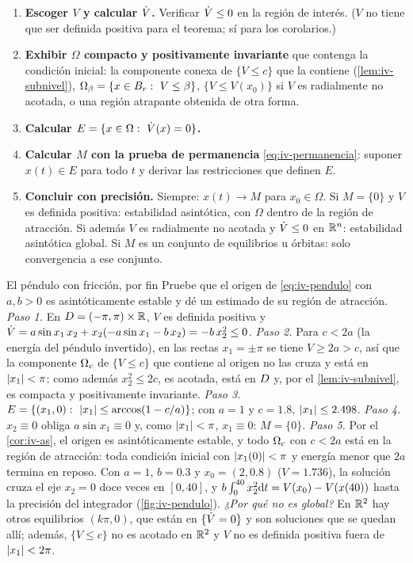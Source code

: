 \begin{receta}
\begin{enumerate}
  \item \textbf{Escoger $V$ y calcular $\dot V$.} Verificar $\dot V\le0$ en la región de interés. ($V$ no tiene que ser definida positiva para el teorema; sí para los corolarios.)
  \item \textbf{Exhibir $\Omega$ compacto y positivamente invariante} que contenga la condición inicial: la componente conexa de $\{V\le c\}$ que la contiene (\cref{lem:iv-subnivel}), $\Omega_\beta=\{x\in B_{r}:\ V\le\beta\}$, $\{V\le V(x_0)\}$ si $V$ es radialmente no acotada, o una región atrapante obtenida de otra forma.
  \item \textbf{Calcular $E=\{x\in\Omega:\ \Vdot(x)=0\}$.}
  \item \textbf{Calcular $M$ con la prueba de permanencia} \eqref{eq:iv-permanencia}: suponer $x(t)\in E$ para todo $t$ y derivar las restricciones que definen $E$.
  \item \textbf{Concluir con precisión.} Siempre: $x(t)\to M$ para $x_0\in\Omega$. Si $M=\{0\}$ y $V$ es definida positiva: estabilidad asintótica, con $\Omega$ dentro de la región de atracción. Si además $V$ es radialmente no acotada y $\dot V\le0$ en $\mathbb{R}^n$: estabilidad asintótica global. Si $M$ es un conjunto de equilibrios u órbitas: solo convergencia a ese conjunto.
\end{enumerate}
\end{receta}

\begin{ejemplo}[label=ej:iv-pendulo]{El péndulo con fricción, por fin}
Pruebe que el origen de \eqref{eq:iv-pendulo} con $a,b>0$ es asintóticamente estable y dé un estimado de su región de atracción.
\solucion \emph{Paso 1.} En $D=(-\pi,\pi)\times\mathbb{R}$, $V$ es definida positiva y $\dot V=a\sin x_1\,x_2+x_2(-a\sin x_1-b\,x_2)=-b\,x_2^2\le0$.
\emph{Paso 2.} Para $c<2a$ (la energía del péndulo invertido), en las rectas $x_1=\pm\pi$ se tiene $V\ge2a>c$, así que la componente $\Omega_{c}$ de $\{V\le c\}$ que contiene al origen no las cruza y está en $\left\lvert x_1\right\rvert<\pi$; como además $x_2^2\le2c$, es acotada, está en $D$ y, por el \cref{lem:iv-subnivel}, es compacta y positivamente invariante.
\emph{Paso 3.} $E=\{(x_1,0):\ \left\lvert x_1\right\rvert\le\arccos(1-c/a)\}$; con $a=1$ y $c=1.8$, $\left\lvert x_1\right\rvert\le2.498$.
\emph{Paso 4.} $x_2\equiv0$ obliga $a\sin x_1\equiv0$ y, como $\left\lvert x_1\right\rvert<\pi$, $x_1\equiv0$: $M=\{0\}$.
\emph{Paso 5.} Por el \cref{cor:iv-as}, el origen es asintóticamente estable, y todo $\Omega_{c}$ con $c<2a$ está en la región de atracción: toda condición inicial con $\left\lvert x_1(0)\right\rvert<\pi$ y energía menor que $2a$ termina en reposo. Con $a=1$, $b=0.3$ y $x_0=(2,0.8)$ ($V=1.736$), la solución cruza el eje $x_2=0$ doce veces en $[0,40]$, y $b\int_0^{40}x_2^2\mathrm{d} t=V(x_0)-V(x(40))$ hasta la precisión del integrador (\cref{fig:iv-pendulo}).
\emph{¿Por qué no es global?} En $\mathbb{R}^2$ hay otros equilibrios $(k\pi,0)$, que están en $\{\dot V=0\}$ y son soluciones que se quedan allí; además, $\{V\le c\}$ no es acotado en $\mathbb{R}^2$ y $V$ no es definida positiva fuera de $\left\lvert x_1\right\rvert<2\pi$.
\end{ejemplo}

